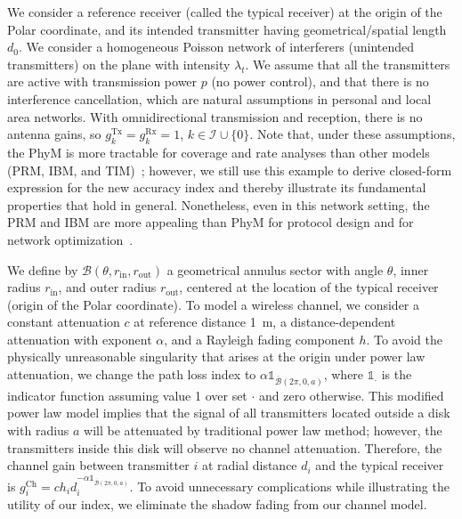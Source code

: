 \documentclass[12pt, draftclsnofoot, onecolumn]{IEEEtran}
\begin{document}
We consider a reference receiver (called the typical receiver) at the origin of the Polar coordinate, and its intended transmitter having geometrical/spatial length $d_{0}$. We consider a homogeneous Poisson network of interferers (unintended transmitters) on the plane with intensity $\lambda_t$. We assume that all the transmitters are active with transmission power $p$ (no power control), and that there is no interference cancellation, which are natural assumptions in personal and local area networks. With omnidirectional transmission and reception, there is no antenna gains, so $g_{k}^{\mathrm{Tx}} = g_{k}^{\mathrm{Rx}} = 1$, $k \in \mathcal{I} \cup \{0\}$. Note that, under these assumptions, the PhyM is more tractable for coverage and rate analyses than other models (PRM, IBM, and TIM)~\cite{Haenggi2013Stochastic}; however, we still use this example to derive closed-form expression for the new accuracy index and thereby illustrate its fundamental properties that hold in general. Nonetheless, even in this network setting, the PRM and IBM are more appealing than PhyM for protocol design and for network optimization~\cite{le2010longest}.


We define by $\mathcal{B}(\theta,r_{\mathrm{in}},r_{\mathrm{out}})$ a geometrical annulus sector with angle $\theta$, inner radius $r_{\mathrm{in}}$, and outer radius $r_{\mathrm{out}}$, centered at the location of the typical receiver (origin of the Polar coordinate). To model a wireless channel, we consider a constant attenuation $c$ at reference distance 1~m, a distance-dependent attenuation with exponent $\alpha$, and a Rayleigh fading component $h$. To avoid the physically unreasonable singularity that arises at the origin under power law attenuation, we change the path loss index to $\alpha \mathds{1}_{\overline{\mathcal{B}}(2\pi,0,a)}$, where $\mathds{1}_{\cdot}$ is the indicator function assuming value 1 over set $\cdot$ and zero otherwise. This modified power law model implies that the signal of all transmitters located outside a disk with radius $a$ will be attenuated by traditional power law method; however, the transmitters inside this disk will observe no channel attenuation.  Therefore, the channel gain between transmitter $i$ at radial distance $d_i$ and the typical receiver is $g_{i}^{\mathrm{Ch}} = c h_i d_{i}^{-\alpha \mathds{1}_{\overline{\mathcal{B}}(2\pi,0,a)}}$. To avoid unnecessary complications while illustrating the utility of our index, we eliminate the shadow fading from our channel model.
\end{document}
